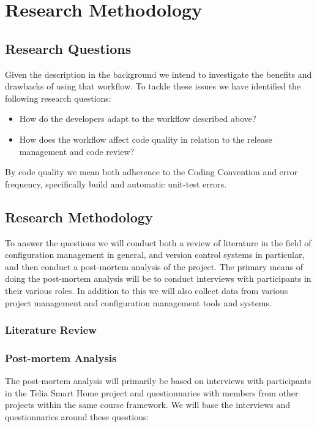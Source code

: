 \documentclass{article}
\begin{document}
\section{Research Methodology}

\subsection{Research Questions}
Given the description in the background we intend to investigate the
benefits and drawbacks of using that workflow. To tackle these issues
we have identified the following research questions:

\begin{itemize}
 \item How do the developers adapt to the workflow described above?
 \item How does the workflow affect code quality in relation to the
       release management and code review?
\end{itemize}

By code quality we mean both adherence to the Coding Convention and
error frequency, specifically build and automatic unit-test errors.

\subsection{Research Methodology}
To answer the questions we will conduct both a review of literature in
the field of configuration management in general, and version control
systems in particular, and then conduct a post-mortem analysis of the
project. The primary means of doing the post-mortem analysis will be
to conduct interviews with participants in their various roles. In
addition to this we will also collect data from various project
management and configuration management tools and systems.

\subsubsection{Literature Review}
\label{sec:litreview}

\subsubsection{Post-mortem Analysis}
The post-mortem analysis will primarily be based on interviews with
participants in the Telia Smart Home project and questionnaries with
members from other projects within the same course framework. We will
base the interviews and questionnaries around these questions:
\end{document}
